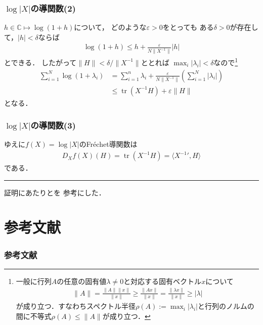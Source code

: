 \documentclass[10pt,usepdftitle=false,hyperref={unicode}]{beamer}
\DeclareMathOperator*{\tr}{tr}
\begin{document}
\begin{frame}
    \frametitle{$\log |X|$の導関数(2)}
    $h \in \mathbb{C} \mapsto \log (1 + h)$について，
    どのような$\varepsilon > 0$をとっても
    ある$\delta > 0$が存在して，$|h| < \delta$ならば
    \begin{align*}
        \log (1 + h) \leq h + \frac{\varepsilon}{N\|X^{-1}\|} |h|
    \end{align*}
    とできる．
    したがって$\|H\| < \delta /\|X^{-1}\|$ととれば
    $\max_i |\lambda_i| < \delta$なので\footnote[frame]{一般に行列$A$の任意の固有値$\lambda \neq 0$と対応する固有ベクトル$x$について
    \begin{align*}
        \|A\| = \frac{\|A\|\|x\|}{\|x\|} \geq \frac{\|Ax\|}{\|x\|} = \frac{\|\lambda x\|}{\|x\|} \geq |\lambda|
    \end{align*}
    が成り立つ．すなわちスペクトル半径$\rho(A) := \max_i |\lambda_i|$と行列のノルムの間に不等式$\rho(A) \leq \|A\|$が成り立つ．}
    \begin{align*}
        \sum_{i = 1}^N \log (1 + \lambda_i) &= \sum_{i = 1}^n \lambda_i + \frac{\varepsilon}{N\|X^{-1}\|} \left(\sum_{i = 1}^N |\lambda_i|\right) \\
                                            &\leq \tr (X^{-1}H) + \varepsilon \|H\|
    \end{align*}
    となる．
\end{frame}

\begin{frame}
    \frametitle{$\log |X|$の導関数(3)}
    ゆえに$f(X) = \log |X|$のFréchet導関数は
    \begin{align*}
        D_{X}f(X)(H) = \tr(X^{-1}H) = \langle X^{-1}{}',H\rangle
    \end{align*}
    である．\hfill\rule{5pt}{10pt}

    \bigskip

    証明にあたり\cite{mantonsblog}と\cite{manton2012}を
    参考にした．
\end{frame}

\section{参考文献}
\begin{frame}
    \frametitle{参考文献}
    
    
\end{frame}
\end{document}
